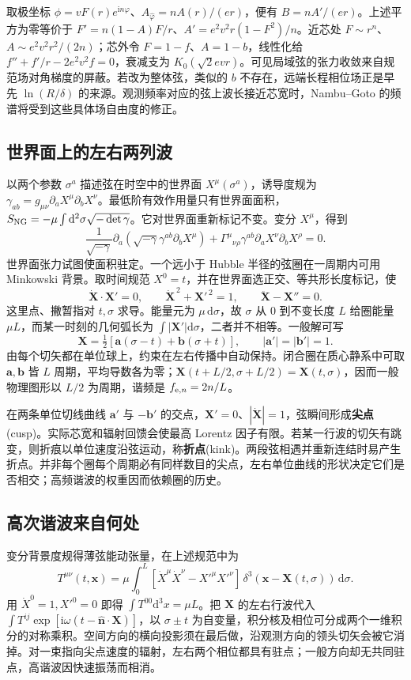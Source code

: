取极坐标 $\phi=vF(r)e^{\mathrm in\varphi}$、$A_{\hat\varphi}=n A(r)/(er)$，便有 $B=nA'/(er)$。上述平方为零等价于 $F'=n(1-A)F/r$、$A'=e^2v^2r(1-F^2)/n$。近芯处 $F\sim r^n$、$A\sim e^2v^2r^2/(2n)$；芯外令 $F=1-f$、$A=1-b$，线性化给 $f''+f'/r-2e^2v^2 f=0$，衰减支为 $K_0(\sqrt2 e v r)$。可见局域弦的张力收敛来自规范场对角梯度的屏蔽。若改为整体弦，类似的 $b$ 不存在，远端长程相位场正是早先 $\ln(R/\delta)$ 的来源。观测频率对应的弦上波长接近芯宽时，Nambu--Goto 的频谱将受到这些具体场自由度的修正。
\subsection{世界面上的左右两列波}

以两个参数 $\sigma^a$ 描述弦在时空中的世界面 $X^\mu(\sigma^a)$，诱导度规为 $\gamma_{ab}=g_{\mu\nu}\partial_aX^\mu\partial_bX^\nu$。最低阶有效作用量只有世界面面积，$S_{\rm NG}=-\mu\int\mathrm d^2\sigma\sqrt{-\det\gamma}$。它对世界面重新标记不变。变分 $X^\mu$，得到
\[
 \frac{1}{\sqrt{-\gamma}}\partial_a
 (\sqrt{-\gamma}\gamma^{ab}\partial_bX^\mu)
 +\Gamma^\mu{}_{\nu\rho}\gamma^{ab}\partial_a X^\nu\partial_bX^\rho=0.
\]
世界面张力试图使面积驻定。一个远小于 Hubble 半径的弦圈在一周期内可用 Minkowski 背景。取时间规范 $X^0=t$，并在世界面选正交、等共形长度标记，使
\[
 \dot{\bm X}\cdot\bm X'=0,\qquad
 \dot{\bm X}^{\,2}+\bm X'^{\,2}=1,\qquad
 \ddot{\bm X}-\bm X''=0 .
\]
这里点、撇暂指对 $t,\sigma$ 求导。能量元为 $\mu\,\mathrm d\sigma$，故 $\sigma$ 从 $0$ 到不变长度 $L$ 给圈能量 $\mu L$，而某一时刻的几何弧长为 $\int|\bm X'|\mathrm d\sigma$，二者并不相等。一般解可写
\[
 \bm X=\tfrac12[\bm a(\sigma-t)+\bm b(\sigma+t)],
 \qquad |\bm a'|=|\bm b'|=1 .
\]
由每个切矢都在单位球上，约束在左右传播中自动保持。闭合圈在质心静系中可取 $\bm a,\bm b$ 皆 $L$ 周期，平均导数各为零；$\bm X(t+L/2,\sigma+L/2)=\bm X(t,\sigma)$，因而一般物理图形以 $L/2$ 为周期，谐频是 $f_{{\rm e},n}=2n/L$。

在两条单位切线曲线 $\bm a'$ 与 $-\bm b'$ 的交点，$\bm X'=0$、$|\dot{\bm X}|=1$，弦瞬间形成\textbf{尖点}(cusp)。实际芯宽和辐射回馈会使最高 Lorentz 因子有限。若某一行波的切矢有跳变，则折痕以单位速度沿弦运动，称\textbf{折点}(kink)。两段弦相遇并重新连结时易产生折点。并非每个圈每个周期必有同样数目的尖点，左右单位曲线的形状决定它们是否相交；高频谐波的权重因而依赖圈的历史。

\subsection{高次谐波来自何处}

变分背景度规得薄弦能动张量，在上述规范中为
\[
 T^{\mu\nu}(t,\bm x)
 =\mu\int_0^L
 [\dot X^\mu\dot X^\nu-X'^\mu X'^\nu]\,
 \delta^3(\bm x-\bm X(t,\sigma))\,\mathrm d\sigma .
\]
用 $\dot X^0=1,X'^0=0$ 即得 $\int T^{00}\mathrm d^3x=\mu L$。把 $\bm X$ 的左右行波代入 $\int T^{ij}\exp[\mathrm i\omega(t-\hat{\bm n}\cdot\bm X)]$，以 $\sigma\pm t$ 为自变量，积分核及相位可分成两个一维积分的对称乘积。空间方向的横向投影须在最后做，沿观测方向的领头切矢会被它消掉。对一束指向尖点速度的辐射，左右两个相位都具有驻点；一般方向却无共同驻点，高谐波因快速振荡而相消。

